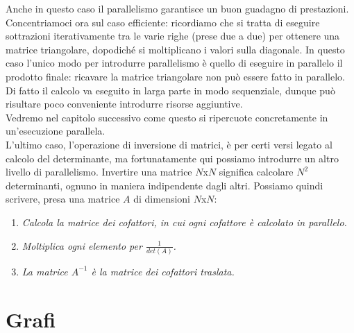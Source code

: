 Anche in questo caso il parallelismo garantisce un buon guadagno di prestazioni. Concentriamoci ora sul caso efficiente: ricordiamo che si tratta di eseguire sottrazioni iterativamente tra le varie righe (prese due a due) per ottenere una matrice triangolare, dopodiché si moltiplicano i valori sulla diagonale. In questo caso l'unico modo per introdurre parallelismo è quello di eseguire in parallelo il prodotto finale: ricavare la matrice triangolare non può essere fatto in parallelo. Di fatto il calcolo va eseguito in larga parte in modo sequenziale, dunque può risultare poco conveniente introdurre risorse aggiuntive.\\
Vedremo nel capitolo successivo come questo si ripercuote concretamente in un'esecuzione parallela.\\
L'ultimo caso, l'operazione di inversione di matrici, è per certi versi legato al calcolo del determinante, ma fortunatamente qui possiamo introdurre un altro livello di parallelismo. Invertire una matrice $N$x$N$ significa calcolare $N^2$ determinanti, ognuno in maniera indipendente dagli altri. Possiamo quindi scrivere, presa una matrice $A$ di dimensioni $N$x$N$:
\begin{enumerate}
\item{\textit{Calcola la matrice dei cofattori, in cui ogni cofattore è calcolato in parallelo.}}
\item{\textit{Moltiplica ogni elemento per $\frac{1}{det(A)}$.}}
\item{\textit{La matrice $A^{-1}$ è la matrice dei cofattori traslata.}}
\end{enumerate}
\section{Grafi}